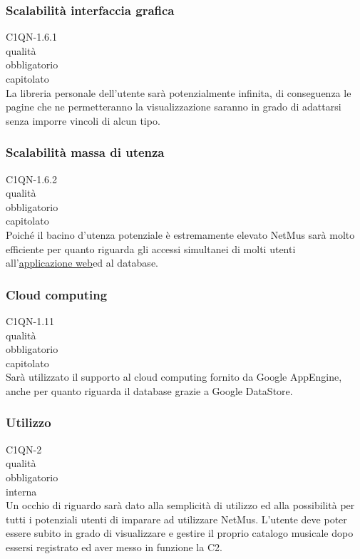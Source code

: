 \subsubsection*{Scalabilit\`a interfaccia grafica}
 C1QN-1.6.1 \\
 qualit\`a \\
 obbligatorio \\
 capitolato \\
La libreria personale dell'utente sar\`a potenzialmente infinita, di conseguenza
le pagine che ne permetteranno la visualizzazione saranno in grado di adattarsi
senza imporre vincoli di alcun tipo.

\subsubsection*{Scalabilit\`a massa di utenza}
 C1QN-1.6.2 \\
 qualit\`a \\
 obbligatorio \\
 capitolato \\
Poich\'e il bacino d'utenza potenziale \`e estremamente elevato NetMus sar\`a molto
efficiente per quanto riguarda gli accessi simultanei di molti utenti
all'\underline{applicazione web}ed al database.

\subsubsection*{Cloud computing}
 C1QN-1.11 \\
 qualit\`a \\
 obbligatorio \\
 capitolato \\
Sar\`a utilizzato il supporto al cloud computing fornito da Google AppEngine,
anche per quanto riguarda il database grazie a Google DataStore.

\subsubsection*{Utilizzo}
 C1QN-2 \\
 qualit\`a \\
 obbligatorio \\
 interna \\
Un occhio di riguardo sar\`a dato alla semplicit\`a di utilizzo ed alla possibilit\`a
per tutti i potenziali utenti di imparare ad utilizzare NetMus. L'utente
deve poter essere subito in grado di visualizzare e gestire il proprio catalogo
musicale dopo essersi registrato ed aver messo in funzione la C2.

